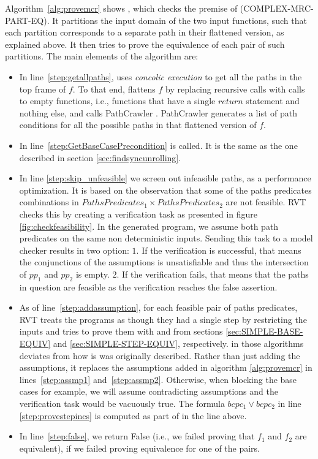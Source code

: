Algorithm~\ref{alg:provemcr} shows 
, which checks the premise of (COMPLEX-MRC-PART-EQ). It partitions the input domain of the two input functions, such that each partition corresponds to a separate path in their flattened version, as explained above. It then tries to prove the equivalence of each pair of such partitions. The main elements of the algorithm are: 
\begin{itemize}
    \item In line~\ref{step:getallpaths},
     uses \emph{concolic execution} to get all the paths in the top frame of $f$. To that end,  flattens $f$ by replacing recursive calls with calls to empty functions, i.e., functions that have a single $return$ statement and nothing else, and calls PathCrawler \cite{10.1007/11408901_21}. PathCrawler generates a list of path conditions for all the possible paths in that flattened version of $f$.  
    \item In line~\ref{step:GetBaseCasePrecondition}  is called. It is the same as the one described in section \ref{sec:findsyncunrolling}.
    \item In line \ref{step:skip_unfeasible} we screen out infeasible paths, as a performance optimization. It is based on the observation that some of the paths predicates combinations in $PathsPredicates_1 \times PathsPredicates_2$ are not feasible. RVT checks this by creating a verification task as presented in figure \ref{fig:checkfeasibility}. In the generated program, we assume both path predicates on the same non deterministic inputs. Sending this task to a model checker results in two option: $1.$ If the verification is successful, that means the conjunctions of the assumptions is unsatisfiable and thus the intersection of $pp_1$ and $pp_2$ is empty. $2.$ If the verification fails, that means that the paths in question are feasible as the verification reaches the false assertion.
    
    \item As of line~\ref{step:addassumption}, for each feasible pair of paths predicates, RVT treats the programs as though they had a single step by restricting the inputs and tries to prove them with  and  from sections \ref{sec:SIMPLE-BASE-EQUIV} and \ref{sec:SIMPLE-STEP-EQUIV}, respectively.  in those algorithms deviates from how is was originally described. Rather than just adding the assumptions, it replaces the assumptions added in algorithm \ref{alg:provemcr} in lines~\ref{step:assmp1} and~\ref{step:assmp2}. Otherwise, when blocking the base cases for example, we will assume contradicting assumptions and the verification task would be vacuously true. The formula $bcpc_1\lor bcpc_2$ in line \ref{step:provestepincs} is computed as part of   in the line above. 
    
    \item In line~\ref{step:false}, we return False (i.e., we failed proving that $f_1$ and $f_2$ are equivalent), if we failed proving equivalence for one of the pairs. 
\end{itemize}

